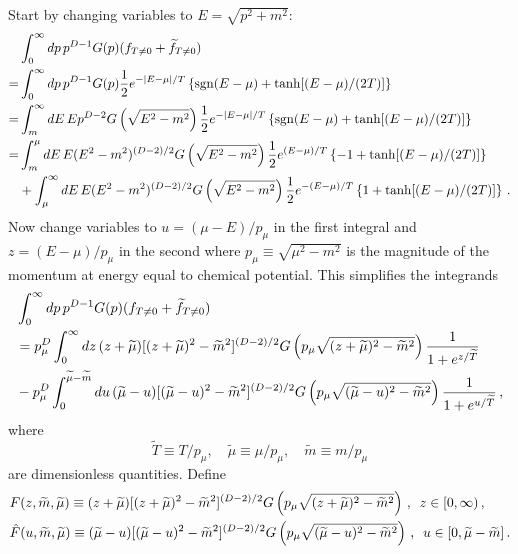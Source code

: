 \documentclass[sn-mathphys,Numbered]{sn-jnl}
\newcommand{\wt}[1]{\widetilde{#1}}
\begin{document}
Start by changing variables to $E=\sqrt{p^2+m^2}$:
\begin{align}
    &\int_0^\infty dp\, p^{D-1} G(p)(f_{T\neq 0}+\widetilde{f}_{T\neq 0})\\
=&\int_0^\infty dp\, p^{D-1} G(p)\frac{1}{2}e^{-|E-\mu|/T}\left\{\mathrm{sgn}(E-\mu)+\tanh[(E-\mu)/(2T)]\right\}\notag\\
    =&\int_m^\infty dE \,Ep^{D-2} G\left(\sqrt{E^2-m^2}\right)\frac{1}{2}e^{-|E-\mu|/T}\left\{\mathrm{sgn}(E-\mu)+\tanh[(E-\mu)/(2T)]\right\}\notag\\
    =&\int_m^{\mu} dE \,E(E^2-m^2)^{(D-2)/2} G\left(\sqrt{E^2-m^2}\right)\frac{1}{2}e^{(E-\mu)/T}\left\{-1+\tanh[(E-\mu)/(2T)]\right\}\notag\\
    &+\int_{\mu}^\infty dE\, E(E^2-m^2)^{(D-2)/2} G\left(\sqrt{E^2-m^2}\right)\frac{1}{2}e^{-(E-\mu)/T}\left\{1+\tanh[(E-\mu)/(2T)]\right\}\,.\notag
\end{align}
Now change variables to $u=(\mu-E)/p_\mu$ in the first integral and $z=(E-\mu)/p_\mu$ in the second where $p_{\mu} \equiv \sqrt{\mu^2 - m^2}$ is the magnitude of the momentum at energy equal to chemical potential. This simplifies the integrands 
\begin{align}
    &\int_0^\infty dp\, p^{D-1} G(p)(f_{T\neq 0}+\widetilde{f}_{T\neq 0})\\
        &=p_\mu^D \int_0^\infty dz\, (z+\widetilde{\mu})[(z+\widetilde{\mu})^2-\widetilde{m}^2]^{(D-2)/2} G\left(p_\mu \sqrt{(z+\widetilde{\mu})^2-\widetilde{m}^2}\right)\frac{1}{1+e^{z/\widetilde{T}}}\notag\\
        &-p_\mu^D \int_0^{\widetilde{\mu}-\widetilde{m}} du\, (\widetilde{\mu}-u)[(\widetilde{\mu}-u)^2-\widetilde{m}^2]^{(D-2)/2} G\left(p_\mu \sqrt{(\widetilde{\mu}-u)^2-\widetilde{m}^2}\right)\frac{1}{1+e^{u/\widetilde{T}}}\,,\notag
\end{align}
where 
\begin{equation}
\widetilde{T} \equiv T/p_\mu, \quad \widetilde{\mu} \equiv \mu/p_\mu, \quad  \widetilde{m} \equiv m/p_\mu     
\end{equation}
are dimensionless quantities. Define
\begin{align}\label{eq:F_tilde_F_def}
  &F(z,\wt{m},\wt{\mu}) \equiv (z+\wt{\mu})[(z+\wt{\mu})^2-\wt{m}^2]^{(D-2)/2} G\left(p_\mu\sqrt{(z+\wt{\mu})^2-\wt{m}^2}\right)\,,\,\,\,z\in[0,\infty)\,,\\ 
  &\hat{F}(u,\wt{m},\wt{\mu}) \equiv (\wt{\mu}-u)[(\wt{\mu}-u)^2-\wt{m}^2]^{(D-2)/2} G\left(p_\mu\sqrt{(\wt{\mu}-u)^2-\wt{m}^2}\right)\,,\,\,\, u\in[0,\wt{\mu}-\wt{m}]\,.\notag
\end{align}
\end{document}
